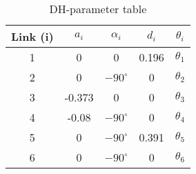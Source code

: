 \begin{table}
  \caption{DH-parameter table}
  \label{tab:rimini_dh_table}
\begin{center}
\begin{tabular}{||c c c c c||} 
 \hline
  Link (i) & $a_i$ & $\alpha_i$ & $d_i$ & $\theta_i$\\ [0.5ex] 
 \hline\hline
 1 & 0  & 0 & 0.196 & $\theta_1$ \\ 
 \hline
  2 & 0 & $-90^{\circ}$ & 0 & $\theta_2$ \\
 \hline
  3 & -0.373  & 0 & 0 & $\theta_3$\\
 \hline
  4 & -0.08 &  $-90^{\circ}$ & 0 & $\theta_4$\\
 \hline
  5 & 0 & $-90^{\circ}$ & 0.391  & $\theta_5$ \\
 \hline
 6 & 0 & $-90^{\circ}$ & 0 & $\theta_6$ \\ [1ex] 
 \hline
\end{tabular}
\end{center}
\end{table}

